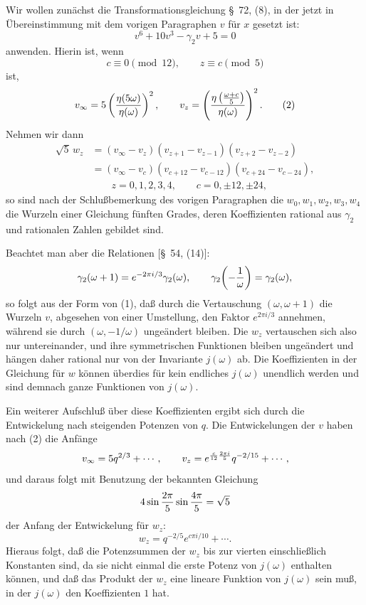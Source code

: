 \documentclass[11pt]{article}
\begin{document}
Wir wollen zunächst die Transformationsgleichung \S~72, (8), in der jetzt in Übereinstimmung mit dem vorigen Paragraphen \(v\) für \(x\) gesetzt ist:
\begin{equation}
 v^6+10v^3-\gamma_2 v+5=0
\tag{1}
\end{equation}
anwenden. Hierin ist, wenn
\[
 c\equiv0\pmod {12},\qquad z\equiv c\pmod5
\]
ist,
\begin{equation}
 v_\infty=5\left({\eta(5\omega)\over\eta(\omega)}\right)^2,\qquad
 v_z=\left({\eta\left({\omega+c\over5}\right)\over\eta(\omega)}\right)^2.
\tag{2}
\end{equation}
Nehmen wir dann
\begin{equation}
\begin{aligned}
 \sqrt5\,w_z
 &= (v_\infty-v_z)(v_{z+1}-v_{z-1})(v_{z+2}-v_{z-2})\\
 &= (v_\infty-v_c)(v_{c+12}-v_{c-12})(v_{c+24}-v_{c-24}),\\
&\hspace{2em} z=0,1,2,3,4,\qquad c=0,\pm12,\pm24,
\end{aligned}
\tag{3}
\end{equation}
so sind nach der Schlußbemerkung des vorigen Paragraphen die \(w_0,w_1,w_2,w_3,w_4\) die Wurzeln einer Gleichung fünften Grades, deren Koeffizienten rational aus \(\gamma_2\) und rationalen Zahlen gebildet sind.

Beachtet man aber die Relationen [\S~54, (14)]:
\[
 \gamma_2(\omega+1)=e^{-2\pi i/3}\gamma_2(\omega),
 \qquad
 \gamma_2\!\left(-{1\over\omega}\right)=\gamma_2(\omega),
\]
so folgt aus der Form von (1), daß durch die Vertauschung \((\omega,\omega+1)\) die Wurzeln \(v\), abgesehen von einer Umstellung, den Faktor \(e^{2\pi i/3}\) annehmen, während sie durch \((\omega,-1/\omega)\) ungeändert bleiben. Die \(w_z\) vertauschen sich also nur untereinander, und ihre symmetrischen Funktionen bleiben ungeändert und hängen daher rational nur von der Invariante \(j(\omega)\) ab. Die Koeffizienten in der Gleichung für \(w\) können überdies für kein endliches \(j(\omega)\) unendlich werden und sind demnach ganze Funktionen von \(j(\omega)\).

Ein weiterer Aufschluß über diese Koeffizienten ergibt sich durch die Entwickelung nach steigenden Potenzen von \(q\). Die Entwickelungen der \(v\) haben nach (2) die Anfänge
\[
 v_\infty=5q^{2/3}+\cdots,\qquad
 v_z=e^{\frac{c}{12}{2\pi i\over5}}q^{-2/15}+\cdots,
\]
und daraus folgt mit Benutzung der bekannten Gleichung
\[
 4\sin {2\pi\over5}\sin {4\pi\over5}=\sqrt5
\]
der Anfang der Entwickelung für \(w_z\):
\begin{equation}
 w_z=q^{-2/5}e^{c\pi i/10}+\cdots.
\tag{4}
\end{equation}
Hieraus folgt, daß die Potenzsummen der \(w_z\) bis zur vierten einschließlich Konstanten sind, da sie nicht einmal die erste Potenz von \(j(\omega)\) enthalten können, und daß das Produkt der \(w_z\) eine lineare Funktion von \(j(\omega)\) sein muß, in der \(j(\omega)\) den Koeffizienten \(1\) hat.
\end{document}
